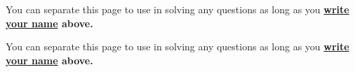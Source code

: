 \documentclass[11pt]{article}
\begin{document}
  \pagebreak

  \begin{center}

    \scratchpaper

    \medskip\smallskip

    \Large

    You can separate this page to use in solving any questions
    \linebreak
    as long as you \textbf{\underline{write your name} above.}

  \end{center}

  \pagebreak

  \begin{center}

    \scratchpaper

    \medskip\smallskip

    \Large

    You can separate this page to use in solving any questions
    \linebreak
    as long as you \textbf{\underline{write your name} above.}

  \end{center}

  \hspace*{1mm}



\end{document}
